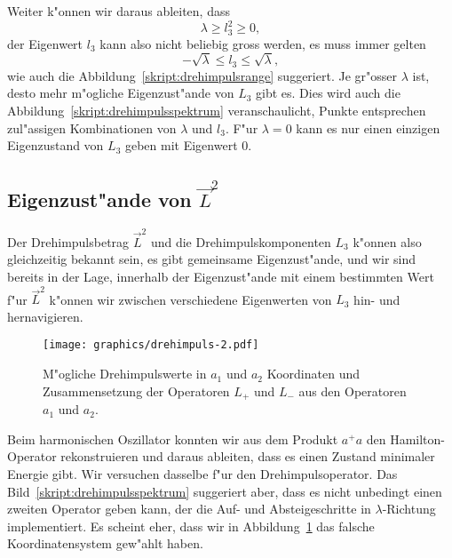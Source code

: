 Weiter k"onnen wir daraus ableiten, dass 
\[
\lambda\ge l_3^2\ge 0,
\]
der Eigenwert $l_3$ kann also nicht beliebig gross werden, es muss immer
gelten
\[
-\sqrt{\lambda}\le l_3\le \sqrt{\lambda},
\]
wie auch die Abbildung~\ref{skript:drehimpulsrange} suggeriert.
Je gr"osser $\lambda$ ist, desto mehr m"ogliche Eigenzust"ande von $L_3$
gibt es.
Dies wird auch die Abbildung~\ref{skript:drehimpulsspektrum} veranschaulicht,
Punkte entsprechen zul"assigen Kombinationen von $\lambda$ und $l_3$.
F"ur $\lambda=0$ kann es nur einen einzigen Eigenzustand von $L_3$ geben
mit Eigenwert $0$.

\subsection{Eigenzust"ande von $\vec L^2$}
Der Drehimpulsbetrag $\vec L^2$ und die Drehimpulskomponenten $L_3$ 
k"onnen also gleichzeitig bekannt sein, es gibt gemeinsame Eigenzust"ande,
und wir sind bereits in der Lage, innerhalb der Eigenzust"ande mit einem
bestimmten Wert f"ur $\vec L^2$ k"onnen wir zwischen verschiedene
Eigenwerten von $L_3$ hin- und hernavigieren.

\begin{figure}
\centering
\texttt{[image: graphics/drehimpuls-2.pdf]}
\caption{M"ogliche Drehimpulswerte in $a_1$ und $a_2$ Koordinaten und
Zusammensetzung der Operatoren $L_+$ und $L_-$ aus den Operatoren
$a_1$ und $a_2$.
\label{skript:drehimpulsspektruma}}
\end{figure}
Beim harmonischen Oszillator konnten wir aus dem Produkt $a^+a$
den Hamilton-Operator rekonstruieren und daraus ableiten, dass es einen
Zustand minimaler Energie gibt.
Wir versuchen dasselbe f"ur den Drehimpulsoperator.
Das Bild~\ref{skript:drehimpulsspektrum} suggeriert aber, dass es nicht
unbedingt einen zweiten Operator geben kann, der die
Auf- und Absteigeschritte in $\lambda$-Richtung implementiert.
Es scheint eher, dass wir in Abbildung~\ref{skript:drehimpulsspektruma}
das falsche Koordinatensystem gew"ahlt haben.

